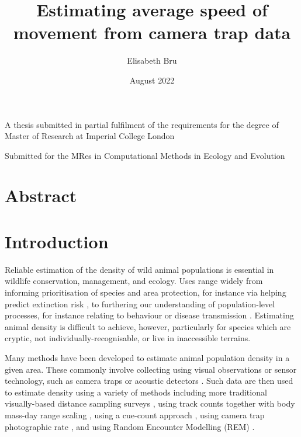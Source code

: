 \documentclass[a4paper,12pt,twoside]{report}
\title{\textbf{Estimating average speed of movement from camera trap data}}
\author[1]{Elisabeth Bru}
\affil[1]{School of Life Sciences, Imperial College London, Silwood Park Campus, Ascot SL5 7PY, UK}
\date{August 2022}
\begin{document}
	
	\pagestyle{fancy}
	\maketitle {}
	   \vfill 
	{\centering A thesis submitted in partial fulfilment of the requirements for the degree of Master of Research at Imperial College London\par}
	{\centering Submitted for the MRes in Computational Methods in Ecology and Evolution\par}
	
	\newpage
	
	\section{Abstract}

	
	\section{Introduction}
	
	Reliable estimation of the density of wild animal populations is essential in wildlife conservation, management, and ecology. Uses range widely from informing prioritisation of species and area protection, for instance via helping predict extinction risk \cite{purvis2000predicting}, to furthering our understanding of population-level processes, for instance relating to behaviour \cite{judge1997rhesus} or disease transmission \cite{lindgren2000impact}. Estimating animal density is difficult to achieve, however, particularly for species which are cryptic, not individually-recognisable, or live in inaccessible terrains.

	Many methods have been developed to estimate animal population density in a given area. These commonly involve collecting using visual observations or sensor technology, such as camera traps \cite{rowcliffe2008surveys} or acoustic detectors \cite{acevedo2006field}. Such data are then used to estimate density using a variety of methods including more traditional visually-based distance sampling surveys \cite{buckland2001introduction}, using track counts together with body mass-day range scaling \cite{keeping2014rapid}, using a cue-count approach \cite{marques2009estimating}, using camera trap photographic rate \cite{carbone2001use}, and using Random Encounter Modelling (REM) \cite{rowcliffe2008estimating, lucas2015generalised}. 
\end{document}
